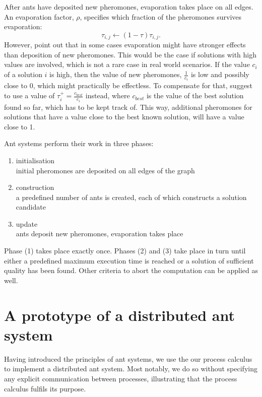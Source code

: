 After ants have deposited new pheromones, evaporation takes place on all edges. An evaporation factor, $\rho$, specifies which fraction of the pheromones survives evaporation:
\begin{equation}
  \label{eqn:evaporation}
  \tau_{i,j} \leftarrow \left( 1 - \tau \right) \tau_{i,j}.
\end{equation}
However, \cite{Bloecker} point out that in some cases evaporation might have stronger effects than deposition of new pheromones. This would be the case if solutions with high values are involved, which is not a rare case in real world scenarios. If the value $c_i$ of a solution $i$ is high, then the value of new pheromones, $\frac{1}{c_i}$ is low and possibly close to $0$, which might practically be effectless. To compensate for that, \cite{Bloecker} suggest to use a value of $\tau_i^+ = \frac{c_{best}}{c_i}$ instead, where $c_{best}$ is the value of the best solution found so far, which has to be kept track of. This way, additional pheromones for solutions that have a value close to the best known solution, will have a value close to 1.

Ant systems perform their work in three phases:
\begin{enumerate}
  \item initialisation \\
    initial pheromones are deposited on all edges of the graph
  \item construction \\
    a predefined number of ants is created, each of which constructs a solution candidate
  \item update \\
    ants deposit new pheromones, evaporation takes place
\end{enumerate}
Phase (1) takes place exactly once. Phases (2) and (3) take place in turn until either a predefined maximum execution time is reached or a solution of sufficient quality has been found. Other criteria to abort the computation can be applied as well.

\section{A prototype of a distributed ant system}
\label{chp:ant_system_implementation}
Having introduced the principles of ant systems, we use the our process calculus to implement a distributed ant system. Most notably, we do so without specifying any explicit communication between processes, illustrating that the process calculus fulfils its purpose.

